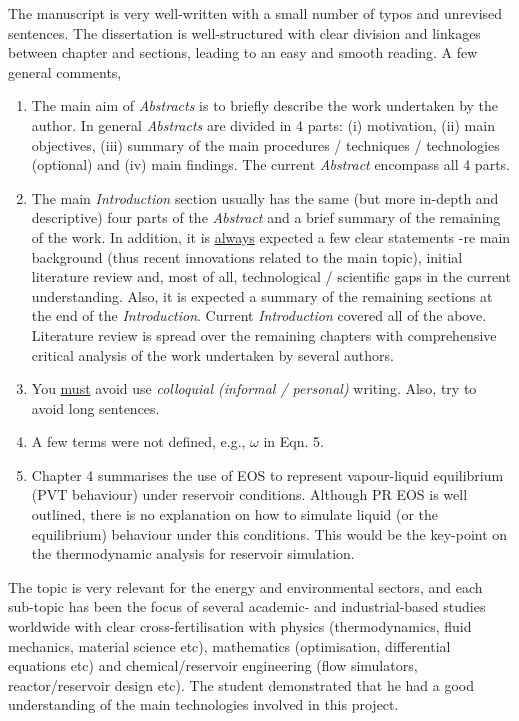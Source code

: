 \documentclass[14pt,twoside]{report}
\begin{document}
\begin{description}
The manuscript is very well-written with a small number of typos and unrevised sentences. The dissertation is well-structured with clear division and linkages between chapter and sections, leading to an easy and smooth reading. A few general comments,
\begin{enumerate} 
%
\item The main aim of {\it Abstracts} is to briefly describe the work undertaken by the author. In general {\it Abstracts} are divided in 4 parts: (i) motivation, (ii) main objectives, (iii) summary of the main procedures / techniques / technologies (optional) and (iv) main findings. The current {\it Abstract} encompass all 4 parts. 
%
\item The main {\it Introduction} section usually has the same (but more in-depth and descriptive) four parts of the {\it Abstract} and a brief summary of the remaining of the work. In addition, it is \underline{always} expected a few clear statements -re main background (thus recent innovations related to the main topic), initial literature review and, most of all, technological / scientific gaps in the current understanding. Also, it is expected a summary of the remaining sections at the end of the {\it Introduction}.  Current {\it Introduction} covered all of the above. Literature review is spread over the remaining chapters with comprehensive critical analysis of the work undertaken by several authors. 
%
\item You \underline{must} avoid use {\it colloquial (informal / personal)} writing. Also, try to avoid long sentences.
%
\item A few terms were not defined, e.g., $\omega$ in Eqn. 5.
%
\item Chapter 4 summarises the use of EOS to represent vapour-liquid equilibrium (PVT behaviour) under reservoir conditions. Although PR EOS is well outlined, there is no explanation on how to simulate liquid (or the equilibrium) behaviour under this conditions. This would be the key-point on the thermodynamic analysis for reservoir simulation.   
%
\end{enumerate}

The topic is very relevant for the energy and environmental sectors, and each sub-topic has been the focus of several academic- and industrial-based studies worldwide with clear cross-fertilisation with physics (thermodynamics, fluid mechanics, material science etc), mathematics (optimisation, differential equations etc) and chemical/reservoir engineering (flow simulators, reactor/reservoir design etc). The student demonstrated that he had a good understanding of the main technologies involved in this project.


\end{description}
\end{document}
